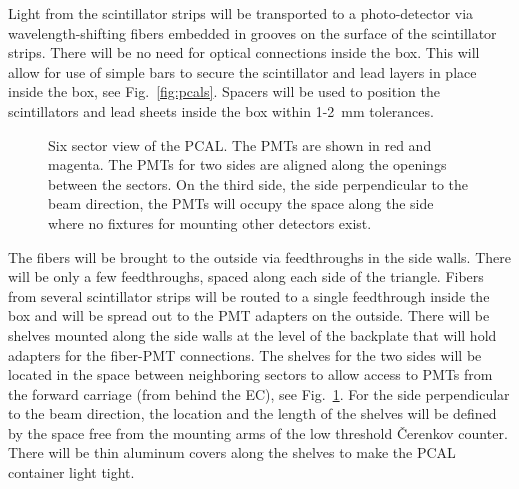 Light from the scintillator strips will be transported to a photo-detector 
via wavelength-shifting fibers embedded in grooves on the surface of 
the scintillator strips.  There will be no need for optical connections 
inside the box.  This will allow for use of simple bars to secure the 
scintillator and lead layers in place inside the box, see 
Fig.~\ref{fig:pcals}.  Spacers will be used to position the scintillators 
and lead sheets inside the box within 1-2~mm tolerances. 

\begin{figure}[ht]
\vspace{110mm}
\caption{\small{Six sector view of the PCAL.  The PMTs are shown in red and
magenta.  The PMTs for two sides are aligned along the openings between 
the sectors.  On the third side, the side perpendicular to the beam direction, 
the PMTs will occupy the space along the side where no fixtures for mounting 
other detectors exist.}}  
\label{fig:pcal6} 
\end{figure}

The fibers will be brought to the outside via feedthroughs in the side walls. 
There will be only a few feedthroughs, spaced along each side of the 
triangle.  Fibers from several scintillator strips will be routed to a single
feedthrough inside the box and will be spread out to the PMT adapters on the 
outside.  There will be shelves mounted along the side walls at the level of 
the backplate that will hold adapters for the fiber-PMT connections.  The 
shelves for the two sides will be located in the space between neighboring 
sectors to allow access to PMTs from the forward carriage (from behind the 
EC), see Fig.~\ref{fig:pcal6}.  For the side perpendicular to the beam 
direction, the location and the length of the shelves will be defined by the 
space free from the mounting arms of the low threshold {\v C}erenkov counter.  
There will be thin aluminum covers along the shelves to make the PCAL 
container light tight.



